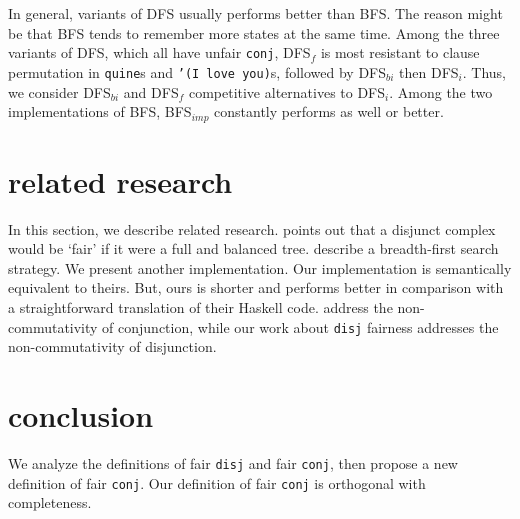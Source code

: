 \documentclass[acmlarge, review=true]{acmart}
\newcommand{\conj}{\texttt{conj}}
\newcommand{\disj}{\texttt{disj}}
\newcommand{\appendo}{\texttt{append$^o$}}
\newcommand{\reverso}{\texttt{revers$^o$}}
\newcommand{\DFSi }[0]{DFS$_{i}$}
\newcommand{\DFSf }[0]{DFS$_{f}$}
\newcommand{\DFSbi}[0]{DFS$_{bi}$}
\newcommand{\BFS}[0]{BFS}
\newcommand{\BFSimp}[0]{BFS$_{imp}$}
\begin{document}

In general, variants of DFS usually performs better than BFS. The reason might 
be that \BFS{} tends to remember more states at the same time. Among the three 
variants of DFS, which all have unfair \conj{}, \DFSf{} is most resistant to 
clause permutation in \texttt{quine}s and \texttt{'(I love you)}s, followed by 
\DFSbi{} then \DFSi{}. Thus, we consider \DFSbi{} and \DFSf{} competitive 
alternatives to \DFSi{}. Among the two implementations of \BFS, \BFSimp{} 
constantly performs as well or better.

\section{related research}

In this section, we describe related research. 
\citet{yang2010adventures} points 
out that a disjunct complex would be `fair' if it were a full and balanced tree.
\citet{seres1999algebra} describe a breadth-first search 
strategy. We present another implementation. Our implementation is semantically 
equivalent to theirs. But, ours is shorter and performs better in comparison 
with a straightforward translation of their Haskell code.
\citet{rozplokhas2018improving} address the non-commutativity of conjunction, 
while our work about \disj{} fairness addresses the non-commutativity of 
disjunction.

\section{conclusion}

We analyze the definitions of fair \disj{} and fair \conj{}, then propose a 
new definition of fair \conj{}. Our definition of fair \conj{} is orthogonal 
with completeness.
\end{document}
